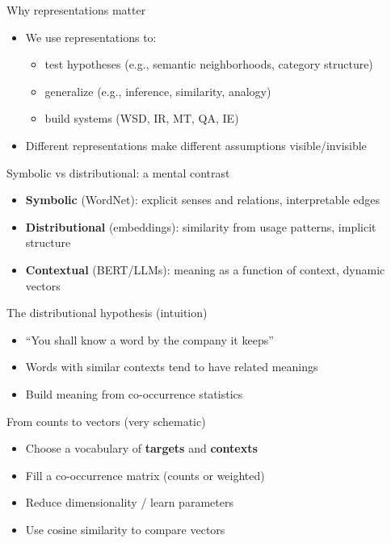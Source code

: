 \documentclass{beamer}
\begin{document}
\begin{frame}{Why representations matter}
\begin{itemize}
  \item We use representations to:
  \begin{itemize}
    \item test hypotheses (e.g., semantic neighborhoods, category structure)
    \item generalize (e.g., inference, similarity, analogy)
    \item build systems (WSD, IR, MT, QA, IE)
  \end{itemize}
  \item Different representations make different assumptions visible/invisible
\end{itemize}
\end{frame}

\begin{frame}{Symbolic vs distributional: a mental contrast}
\begin{itemize}
  \item \textbf{Symbolic} (WordNet): explicit senses and relations, interpretable edges
  \item \textbf{Distributional} (embeddings): similarity from usage patterns, implicit structure
  \item \textbf{Contextual} (BERT/LLMs): meaning as a function of context, dynamic vectors
\end{itemize}
\end{frame}

\begin{frame}{The distributional hypothesis (intuition)}
\begin{itemize}
  \item ``You shall know a word by the company it keeps''
  \item Words with similar contexts tend to have related meanings
  \item Build meaning from co-occurrence statistics
\end{itemize}
\end{frame}

\begin{frame}{From counts to vectors (very schematic)}
\begin{itemize}
  \item Choose a vocabulary of \textbf{targets} and \textbf{contexts}
  \item Fill a co-occurrence matrix (counts or weighted)
  \item Reduce dimensionality / learn parameters
  \item Use cosine similarity to compare vectors
\end{itemize}
\end{frame}
\end{document}
